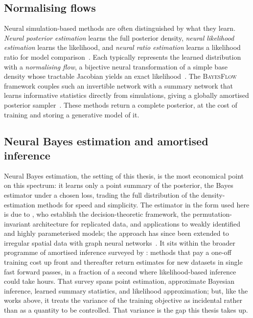 \subsection{Normalising flows}
\label{sec:rw-flows}

Neural simulation-based methods are often distinguished by what they
learn. \emph{Neural posterior estimation} learns the full posterior
density, \emph{neural likelihood estimation} learns the
likelihood, and \emph{neural ratio
estimation} learns a likelihood ratio for model comparison~\citep{papamakarios2019snl}. Each
typically represents the learned distribution with a \emph{normalising
flow}, a bijective neural transformation of a simple base density whose
tractable Jacobian yields an exact likelihood~\citep{papamakarios2017maf,
papamakarios2021flows}. The \textsc{BayesFlow} framework couples such
an invertible network with a summary network that learns informative
statistics directly from simulations, giving a globally amortised
posterior sampler~\citep{radev2020bayesflow, radev2023bayesflow}. These
methods return a complete posterior, at the cost of training and
storing a generative model of it.

\subsection{Neural Bayes estimation and amortised inference}
\label{sec:rw-nbe}

Neural Bayes estimation, the setting of this thesis, is the most
economical point on this spectrum: it learns only a point summary of
the posterior, the Bayes estimator under a chosen loss, trading
the full distribution of the density-estimation methods for speed and
simplicity. The estimator in the form used here is due to
\citet{sainsburydale2024nbe}, who establish the decision-theoretic
framework, the permutation-invariant architecture for replicated data,
and applications to weakly identified and highly parameterised models;
the approach has since been extended to irregular spatial data with
graph neural networks~\citep{sainsburydale2025graph}. It sits within
the broader programme of amortised inference surveyed by
\citet{zammitmangion2025neural}: methods that pay a one-off training
cost up front and thereafter return estimates for new datasets in single fast forward passes, in a fraction of a second where likelihood-based inference could
take hours. That survey spans point estimation, approximate Bayesian
inference, learned summary statistics, and likelihood approximation;
but, like the works above, it treats the variance of the training
objective as incidental rather than as a quantity to be controlled.
That variance is the gap this thesis takes up.


